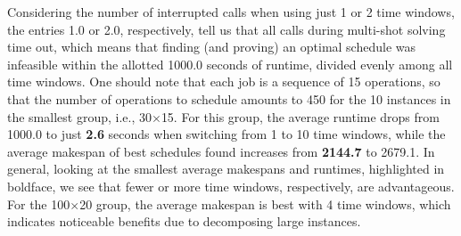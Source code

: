 \documentclass[runningheads]{llncs}
\begin{document}
%
Considering the number of interrupted calls when using just 1 or 2 time windows,
the entries 1.0 or 2.0, respectively, tell us that all calls during multi-shot
solving time out, which means that finding (and proving) an optimal schedule was infeasible
within the allotted 1000.0 seconds of runtime, divided evenly among all time windows.
One should note that each job is a sequence of 15 operations, so that the number of
operations to schedule amounts to 450 for the 10 instances in the smallest group, i.e., 30$\times$15.
For this group,
the average runtime drops from 1000.0 to just \textbf{2.6} seconds when switching from
1 to 10 time windows,
while the average makespan of best schedules found increases from \textbf{2144.7} to 2679.1.
In general, looking at the smallest average makespans and runtimes, highlighted in boldface,
we see that fewer or more time windows, respectively, are advantageous.
For the 100$\times$20 group, %
the average makespan is best with 4 time windows, which indicates noticeable benefits due to
decomposing large instances.
\end{document}
